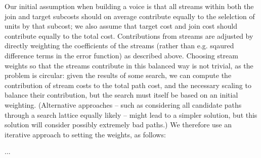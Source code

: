 Our initial assumption when building a voice is that all streams within both the join and target subcosts
should on average contribute equally to the selelction of units by that subcost; we also assume that 
target cost and join cost should contribute equally to the total cost. 
Contributions from streams are adjusted by directly weighting the coefficients of the streams (rather than
e.g. sqaured difference terms in the error function) as described above.
Choosing stream weights so that the streams contribute in this balanced way is not trivial, as the problem
is circular: given the results of some search, we can compute the contribution of stream costs to the
total path cost, and the necessary scaling to balance their contribution, but the search must itself be based on an initial weighting. (Alternative approaches -- such as considering all candidate paths through a search lattice equally likely -- might lead to a simpler solution, but this solution will consider possibly extremely bad paths.) We therefore use an iterative approach to setting the weights, as follows:

...



